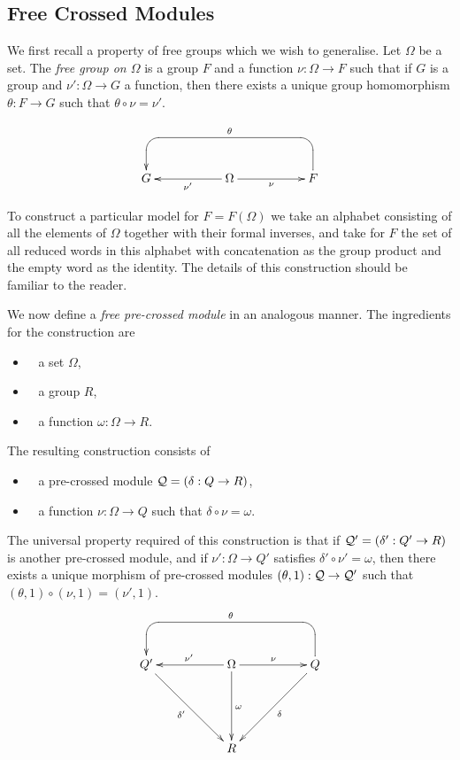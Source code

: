 \subsection{Free Crossed Modules} \label{subs:free-xmod}

We first recall a property of free groups which we wish to generalise.
Let  $\Omega$  be a set.
The \emph{free group on $\Omega$} is a group $F$ and a function
$\nu : \Omega \to F$  such that if $G$ is a group and  
$\nu' : \Omega \to G$ a function, then there exists a unique
group homomorphism  $\theta : F \to G$  such that  
$\theta\circ\nu = \nu'$.

$$\xy
\xymatrix{
   &&&&&&  \\
   &      G  
    &&    \Omega  \ar[rr]_{\nu} 
             \ar[ll]^{\nu'}   
      &&  F  \ar `u[-1,-1] `[0,-4]_{\theta} [0,-4]
        &    \\
}
\endxy$$

\bigskip
To construct a particular model for $F = F(\Omega)$ we take an alphabet
consisting of all the elements of $\Omega$ together with their
formal inverses, and take for $F$ the set of all reduced words
in this alphabet with concatenation as the group product
and the empty word as the identity.  The details of this construction
should be familiar to the reader.

We now define a \emph{free pre-crossed module} in an analogous manner.
The ingredients for the construction are
\begin{itemize}
\item~ a set $\Omega$,
\item~ a group $R$,
\item~ a function $\omega : \Omega \to R$.
\end{itemize}
The resulting construction consists of
\begin{itemize}
\item~ a pre-crossed module $\mathcal{Q} = (\delta : Q \to R)$,
\item~ a function  $\nu : \Omega \to Q$  such that  
$\delta\circ\nu = \omega$.
\end{itemize}
The universal property required of this construction 
is that if  $\mathcal{Q}' = (\delta' : Q' \to R)$
is another pre-crossed module, and if  $\nu' : \Omega \to Q'$
satisfies  $\delta'\circ\nu' = \omega$,
then there exists a unique morphism of pre-crossed modules
$(\theta,1) : \mathcal{Q} \to \mathcal{Q}'$  such that  
$(\theta,1)\circ(\nu,1) = (\nu',1)$.
$$
\xy
\xymatrix{
   &&&&&&  \\
   &      Q' \ar[ddrr]_{\delta'}
    &&    \Omega  \ar[rr]^{\nu} 
             \ar[ll]_{\nu'}  
             \ar[dd]^{\omega} 
      &&  Q  \ar[ddll] ^{\delta}  
           \ar `u[-1,-1] `[0,-4]_{\theta} [0,-4]
        &    \\
   &&&&&& \\
   &&&    R
      &&& \\ 
}
\endxy$$

